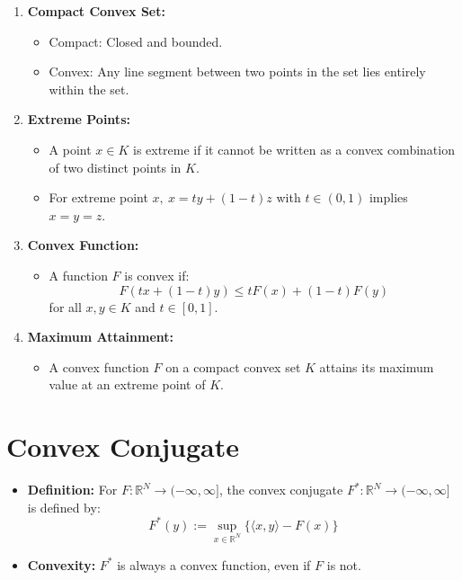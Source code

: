 \documentclass{article}
\begin{document}
\begin{enumerate}
    \item \textbf{Compact Convex Set:}
    \begin{itemize}
        \item Compact: Closed and bounded.
        \item Convex: Any line segment between two points in the set lies entirely within the set.
    \end{itemize}

    \item \textbf{Extreme Points:}
    \begin{itemize}
        \item A point \( x \in K \) is extreme if it cannot be written as a convex combination of two distinct points in \( K \).
        \item For extreme point \( x, \ x = ty + (1-t)z \) with \( t \in (0,1) \) implies \( x = y = z \).
    \end{itemize}

    \item \textbf{Convex Function:}
    \begin{itemize}
        \item A function \( F \) is convex if:
        \[
        F(tx + (1-t)y) \leq tF(x) + (1-t)F(y)
        \]
        for all \( x, y \in K \) and \( t \in [0, 1] \).
    \end{itemize}

    \item \textbf{Maximum Attainment:}
    \begin{itemize}
        \item A convex function \( F \) on a compact convex set \( K \) attains its maximum value at an extreme point of \( K \).
    \end{itemize}
\end{enumerate}




\section*{Convex Conjugate}

\begin{itemize}
    \item \textbf{Definition:} For \( F : \mathbb{R}^N \to (-\infty, \infty] \), the convex conjugate \( F^* : \mathbb{R}^N \to (-\infty, \infty] \) is defined by:
    \[
    F^*(y) := \sup_{x \in \mathbb{R}^N} \{ \langle x, y \rangle - F(x) \}
    \]
    \item \textbf{Convexity:} \( F^* \) is always a convex function, even if \( F \) is not.
\end{itemize}
\end{document}

